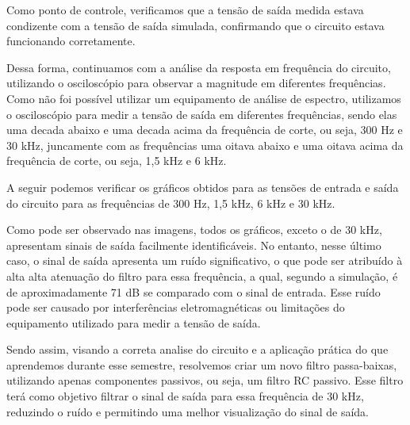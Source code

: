 
Como ponto de controle, verificamos que a tensão de saída medida estava condizente com a tensão de saída simulada, confirmando que o circuito estava funcionando corretamente. 

Dessa forma, continuamos com a análise da resposta em frequência do circuito, utilizando o osciloscópio para observar a magnitude em diferentes frequências. Como não foi possível utilizar um equipamento de análise de espectro, utilizamos o osciloscópio para medir a tensão de saída em diferentes frequências, sendo elas uma decada abaixo e uma decada acima da frequência de corte, ou seja, 300 Hz e 30 kHz, juncamente com as frequências uma oitava abaixo e uma oitava acima da frequência de corte, ou seja, 1,5 kHz e 6 kHz.

A seguir podemos verificar os gráficos obtidos para as tensões de entrada e saída do circuito para as frequências de 300 Hz, 1,5 kHz, 6 kHz e 30 kHz.





Como pode ser observado nas imagens, todos os gráficos, exceto o de 30 kHz, apresentam sinais de saída facilmente identificáveis. No entanto, nesse último caso, o sinal de saída apresenta um ruído significativo, o que pode ser atribuído à alta alta atenuação do filtro para essa frequência, a qual, segundo a simulação, é de aproximadamente 71 dB se comparado com o sinal de entrada. Esse ruído pode ser causado por interferências eletromagnéticas ou limitações do equipamento utilizado para medir a tensão de saída.

Sendo assim, visando a correta analise do circuito e a aplicação prática do que aprendemos durante esse semestre, resolvemos criar um novo filtro passa-baixas, utilizando apenas componentes passivos, ou seja, um filtro RC passivo. Esse filtro terá como objetivo filtrar o sinal de saída para essa frequência de 30 kHz, reduzindo o ruído e permitindo uma melhor visualização do sinal de saída.

